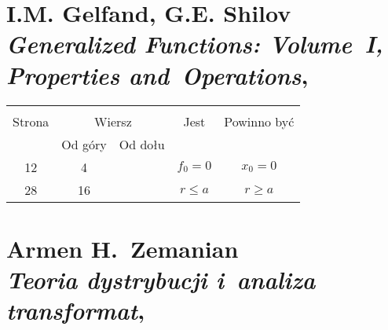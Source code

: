 \documentclass[a4paper,11pt]{article}
\numberwithin{equation}{section}
\begin{document}

\VerSpaceSix













\section{I.M. Gelfand, G.E. Shilov \\
  \textit{Generalized Functions: Volume~I, Properties and~Operations},
  \parencite{Gelfand-Shilov-Generalized-Functions-Vol-I-Pub-1964}}





\begin{center}

  \begin{tabular}{|c|c|c|c|c|}
    \hline
    & \multicolumn{2}{c|}{} & & \\
    Strona & \multicolumn{2}{c|}{Wiersz} & Jest
                              & Powinno być \\ \cline{2-3}
    & Od góry & Od dołu & & \\
    \hline
    12  & \hphantom{0}4 & & $f_{ 0 } = 0$ & $x_{ 0 } = 0$ \\
    28  & 16 & & $r \leq a$ & $r \geq a$ \\
    \hline
  \end{tabular}

\end{center}

\VerSpaceSix













\section{Armen H.~Zemanian \\
  \textit{Teoria dystrybucji i~analiza transformat},
  \parencite{Zemanian-Teoria-dystrybucji-ETC-Pub-1969}}
\end{document}

